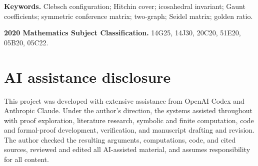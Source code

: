 \documentclass[11pt]{article}
\theoremstyle{remark}
\begin{document}
\noindent\textbf{Keywords.} Clebsch configuration; Hitchin cover;
icosahedral invariant; Gaunt coefficients; symmetric conference matrix;
two-graph; Seidel matrix; golden ratio.

\smallskip
\noindent\textbf{2020 Mathematics Subject Classification.} 14G25, 14J30,
20C20, 51E20, 05B20, 05C22.









\clearpage
\appendix



\section*{AI assistance disclosure}

This project was developed with extensive assistance from OpenAI Codex and
Anthropic Claude. Under the author's direction, the systems assisted
throughout with proof exploration, literature research, symbolic and finite
computation, code and formal-proof development, verification, and manuscript
drafting and revision. The author checked the resulting arguments,
computations, code, and cited sources, reviewed and edited all AI-assisted
material, and assumes responsibility for all content.


\end{document}

